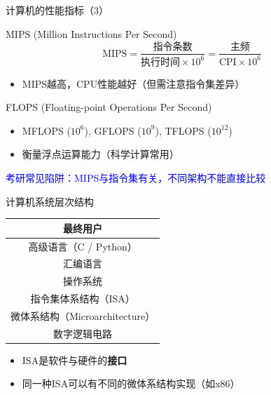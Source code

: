 \documentclass[10pt, aspectratio=169]{beamer}
\begin{document}
\begin{frame}{计算机的性能指标（3）}
    \begin{block}{MIPS (Million Instructions Per Second)}
        \[
            \text{MIPS} = \frac{\text{指令条数}}{\text{执行时间} \times 10^6} = \frac{\text{主频}}{\text{CPI} \times 10^6}
        \]
        \begin{itemize}
            \item MIPS越高，CPU性能越好（但需注意指令集差异）
        \end{itemize}
    \end{block}
    \begin{block}{FLOPS (Floating-point Operations Per Second)}
        \begin{itemize}
        \item MFLOPS ($10^6$), GFLOPS ($10^9$), TFLOPS ($10^{12}$)
        \item 衡量浮点运算能力（科学计算常用）
        \end{itemize}
    \end{block}
    \vspace{0.3em}
    \begin{center}
        \textcolor{blue}{考研常见陷阱：MIPS与指令集有关，不同架构不能直接比较}
    \end{center}
\end{frame}

\begin{frame}{计算机系统层次结构}
    \begin{center}
        \begin{tabular}{c}
            \hline
            最终用户 \\
            \hline
            高级语言（C / Python） \\
            \hline
            汇编语言 \\
            \hline
            操作系统 \\
            \hline
            指令集体系结构（ISA） \\
            \hline
            微体系结构（Microarchitecture） \\
            \hline
            数字逻辑电路 \\
            \hline
        \end{tabular}
    \end{center}
    \vspace{0.5em}
    \begin{itemize}
        \item ISA是软件与硬件的\textbf{接口}
        \item 同一种ISA可以有不同的微体系结构实现（如x86）
    \end{itemize}
\end{frame}
\end{document}
